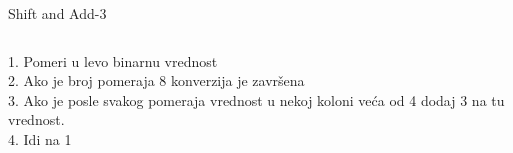 \begin{frame}[label=06-s011]{Shift and Add-3}
\begin{columns}[c,onlytextwidth]
1. Pomeri u levo binarnu vrednost\\
2. Ako je broj pomeraja 8 konverzija je završena\\
3. Ako je posle svakog pomeraja vrednost u nekoj koloni veća od 4 dodaj 3 na tu vrednost.\\
4. Idi na 1
\centering
\end{columns}
\end{frame}
